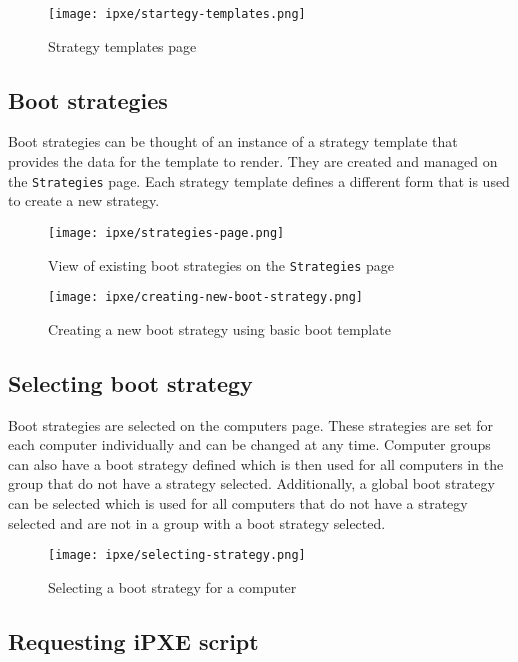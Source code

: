 \documentclass[../main.tex]{subfiles}
\begin{document}
\begin{figure}[H]
  \centering
  \texttt{[image: ipxe/startegy-templates.png]}
  \caption{Strategy templates page}
\end{figure}

\subsection{Boot strategies}

Boot strategies can be thought of an instance of a strategy template that provides the data for the template to render.
They are created and managed on the \texttt{Strategies} page.
Each strategy template defines a different form that is used to create a new strategy.

\begin{figure}[H]
  \centering
  \texttt{[image: ipxe/strategies-page.png]}
  \caption{View of existing boot strategies on the \texttt{Strategies} page}
\end{figure}

\begin{figure}[H]
  \centering
  \texttt{[image: ipxe/creating-new-boot-strategy.png]}
  \caption{Creating a new boot strategy using basic boot template}
\end{figure}

\subsection{Selecting boot strategy}

Boot strategies are selected on the computers page. These strategies are set for each computer individually and can be changed at any time.
Computer groups can also have a boot strategy defined which is then used for all computers in the group that do not have a strategy selected.
Additionally, a global boot strategy can be selected which is used for all computers that do not have a strategy selected and are not in a group with a boot strategy selected.

\begin{figure}[H]
  \centering
  \texttt{[image: ipxe/selecting-strategy.png]}
  \caption{Selecting a boot strategy for a computer}
\end{figure}

\subsection{Requesting iPXE script}
\end{document}
